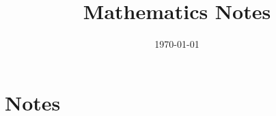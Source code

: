\documentclass[11pt]{article}
\title{Mathematics Notes}
\author{}
\date{\today}
\theoremstyle{definition}
\theoremstyle{remark}
\begin{document}
\maketitle

\section{Notes}
\end{document}
